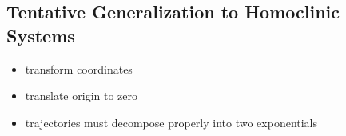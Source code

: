 

\subsection{Tentative Generalization to Homoclinic Systems}

\begin{itemize}
 \item transform coordinates
 \item translate origin to zero
 \item trajectories must decompose properly into two exponentials
\end{itemize}

